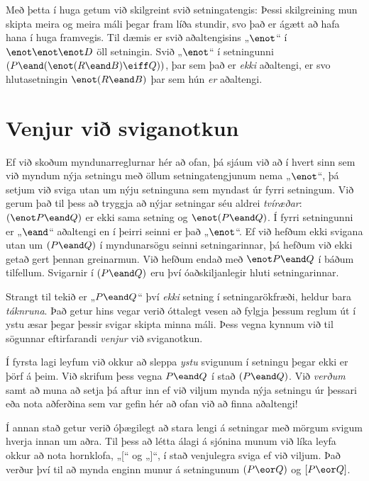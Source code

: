 Með þetta í huga getum við skilgreint svið setningatengis:
Þessi skilgreining mun skipta meira og meira máli þegar fram líða stundir, svo það er ágætt að hafa hana í huga framvegis. Til dæmis er svið aðaltengisins „$\enot$“ í $\enot \enot \enot D$ öll setningin. Svið „$\enot$“ í setningunni $(P \eand (\enot (R \eand B) \eiff Q))$, þar sem það er \emph{ekki} aðaltengi, er svo hlutasetningin $\enot (R \eand B)$ þar sem hún \emph{er} aðaltengi.

\section{Venjur við sviganotkun}
\label{TFLconventions}

Ef við skoðum myndunarreglurnar hér að ofan, þá sjáum við að í hvert sinn sem við myndum nýja setningu með öllum setningatengjunum nema „$\enot$“, þá setjum við sviga utan um nýju setninguna sem myndast úr fyrri setningum. Við gerum það til þess að tryggja að nýjar setningar séu aldrei \emph{tvíræðar}: $(\enot P \eand Q)$ er ekki sama setning og $\enot(P \eand Q)$. Í fyrri setningunni er „$\eand$“ aðaltengi en í þeirri seinni er það „$\enot$“. Ef við hefðum ekki svigana utan um $(P \eand Q)$ í myndunarsögu seinni setningarinnar, þá hefðum við ekki getað gert þennan greinarmun. Við hefðum endað með $\enot P \eand Q$ í báðum tilfellum. Svigarnir í $(P \eand Q)$ eru því óaðskiljanlegir hluti setningarinnar. 
 
Strangt til tekið er „$P \eand Q$“ því \emph{ekki} setning í setningarökfræði, heldur bara \emph{táknruna}. Það getur hins vegar verið óttalegt vesen að fylgja þessum reglum út í ystu æsar þegar þessir svigar skipta minna máli. Þess vegna kynnum við til sögunnar eftirfarandi \emph{venjur} við sviganotkun.

Í fyrsta lagi leyfum við okkur að sleppa \emph{ystu} svigunum í setningu þegar ekki er þörf á þeim. Við skrifum þess vegna $P \eand Q$ í stað $(P \eand Q)$. Við \emph{verðum} samt að muna að setja þá aftur inn ef við viljum mynda nýja setningu úr þessari eða nota aðferðina sem var gefin hér að ofan við að finna aðaltengi!
 
Í annan stað getur verið óþægilegt að stara lengi á setningar með mörgum svigum hverja innan um aðra. Til þess að létta álagi á sjónina munum við líka leyfa okkur að nota hornklofa, „[“ og „]“, í stað venjulegra sviga ef við viljum. Það verður því til að mynda enginn munur á setningunum $(P\eor Q)$ og $[P\eor Q]$. 

